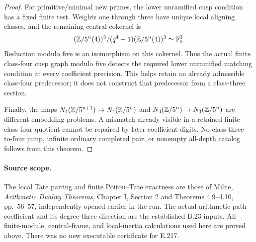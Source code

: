 \begin{proof}
For primitive/minimal new primes, the lower unramified cusp condition has a fixed finite test. Weights one through three have unique local aligning classes, and the remaining central cokernel is
\[
 (\mathbb Z/5^n(4))^3/(q^4-1)(\mathbb Z/5^n(4))^3\simeq\mathbb F_5^3.
\]
Reduction modulo five is an isomorphism on this cokernel. Thus the actual finite class-four cusp graph modulo five detects the required lower unramified matching condition at every coefficient precision. This helps retain an already admissible class-four predecessor; it does not construct that predecessor from a class-three section.

Finally, the maps $N_4(\mathbb Z/5^{n+1})\to N_4(\mathbb Z/5^n)$ and $N_4(\mathbb Z/5^n)\to N_3(\mathbb Z/5^n)$ are different embedding problems. A mismatch already visible in a retained finite class-four quotient cannot be repaired by later coefficient digits. No class-three-to-four jump, infinite ordinary completed pair, or nonempty all-depth catalog follows from this theorem.
\end{proof}

\paragraph{Source scope.}
The local Tate pairing and finite Poitou--Tate exactness are those of Milne, \emph{Arithmetic Duality Theorems}, Chapter I, Section 2 and Theorems 4.9--4.10, pp.~56--57, independently opened earlier in the run. The actual arithmetic path coefficient and its degree-three direction are the established B.23 inputs. All finite-module, central-frame, and local-inertia calculations used here are proved above. There was no new executable certificate for E.217.
